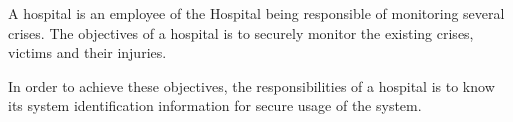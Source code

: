 A hospital is an employee of the Hospital being responsible of monitoring several crises. The objectives of a hospital is to securely monitor the existing crises, victims and their injuries.

\vspace{0.5cm}

In order to achieve these objectives, the responsibilities of a hospital is to know its system identification information for secure usage of the system.
